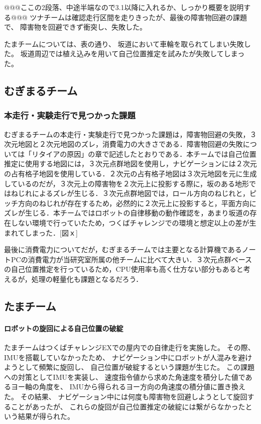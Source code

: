 \documentclass[twocolumn,9pt]{jsproceedings}
\begin{document}
@@@ここの2段落、中途半端なので3.1以降に入れるか、しっかり概要を説明する@@@
ツナチームは確認走行区間を走りきったが、最後の障害物回避の課題で、
障害物を回避できず衝突し、失敗した。

たまチームについては、表の通り、
坂道において車輪を取られてしまい失敗した。
坂道周辺では植え込みを用いて自己位置推定を試みたが失敗してしまった。

\subsection{むぎまるチーム}
\subsubsection{本走行・実験走行で見つかった課題}

むぎまるチームの本走行・実験走行で見つかった課題は，障害物回避の失敗，３次元地図と２次元地図のズレ，消費電力の大きさである．障害物回避の失敗については「リタイアの原因」の章で記述したとおりである．本チームでは自己位置推定に使用する地図には，３次元点群地図を使用し，ナビゲーションには２次元の占有格子地図を使用している．２次元の占有格子地図は３次元地図を元に生成しているのだが，３次元上の障害物を２次元上に投影する際に，坂のある地形ではねじれによるズレが生じる．３次元点群地図では，ロール方向のねじれと，ピッチ方向のねじれが存在するため，必然的に２次元上に投影すると，平面方向にズレが生じる．本チームではロボットの自律移動の動作確認を，あまり坂道の存在しない環境で行っていたため，つくばチャレンジでの環境と想定以上の差が生まれてしまった．[図ｘ]

最後に消費電力についてだが，むぎまるチームでは主要となる計算機であるノートPCの消費電力が当研究室所属の他チームに比べて大きい．３次元点群ベースの自己位置推定を行っているため，CPU使用率も高く仕方ない部分もあると考えるが，処理の軽量化も課題となるだろう．

\subsection{たまチーム}
\paragraph{ロボットの旋回による自己位置の破綻}


たまチームはつくばチャレンジEXでの屋内での自律走行を実施した。
その際、IMUを搭載していなかったため、
ナビゲーション中にロボットが人混みを避けようとして頻繁に旋回し、
自己位置が破綻するという課題が生じた。
この課題への対策としてIMUを実装し、
速度指令値から求めた角速度を積分した値であるヨー軸の角度を、
IMUから得られるヨー方向の角速度の積分値に置き換えた。
その結果、
ナビゲーション中には何度も障害物を回避しようとして旋回することがあったが、
これらの旋回が自己位置推定の破綻には繋がらなかったという結果が得られた。
\end{document}
